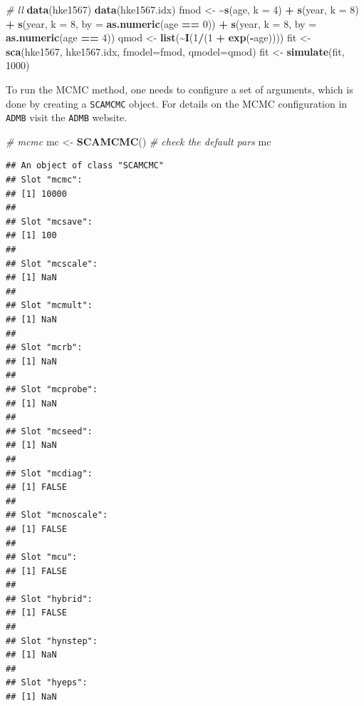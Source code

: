 \documentclass[
]{book}
\newenvironment{Shaded}{\begin{snugshade}}{\end{snugshade}}
\newcommand{\AttributeTok}[1]{\textcolor[rgb]{0.13,0.29,0.53}{#1}}
\newcommand{\CommentTok}[1]{\textcolor[rgb]{0.56,0.35,0.01}{\textit{#1}}}
\newcommand{\DecValTok}[1]{\textcolor[rgb]{0.00,0.00,0.81}{#1}}
\newcommand{\ErrorTok}[1]{\textcolor[rgb]{0.64,0.00,0.00}{\textbf{#1}}}
\newcommand{\FunctionTok}[1]{\textcolor[rgb]{0.13,0.29,0.53}{\textbf{#1}}}
\newcommand{\NormalTok}[1]{#1}
\newcommand{\OtherTok}[1]{\textcolor[rgb]{0.56,0.35,0.01}{#1}}
\newcommand{\SpecialCharTok}[1]{\textcolor[rgb]{0.81,0.36,0.00}{\textbf{#1}}}
\begin{document}
\begin{Shaded}
\begin{Highlighting}[]
\CommentTok{\# ll}
\FunctionTok{data}\NormalTok{(hke1567)}
\FunctionTok{data}\NormalTok{(hke1567.idx)}
\NormalTok{fmod }\OtherTok{\textless{}{-}} \ErrorTok{\textasciitilde{}}\FunctionTok{s}\NormalTok{(age, }\AttributeTok{k =} \DecValTok{4}\NormalTok{) }\SpecialCharTok{+} \FunctionTok{s}\NormalTok{(year, }\AttributeTok{k =} \DecValTok{8}\NormalTok{) }\SpecialCharTok{+} \FunctionTok{s}\NormalTok{(year, }\AttributeTok{k =} \DecValTok{8}\NormalTok{, }\AttributeTok{by =} \FunctionTok{as.numeric}\NormalTok{(age }\SpecialCharTok{==} \DecValTok{0}\NormalTok{)) }\SpecialCharTok{+} \FunctionTok{s}\NormalTok{(year, }\AttributeTok{k =} \DecValTok{8}\NormalTok{, }\AttributeTok{by =} \FunctionTok{as.numeric}\NormalTok{(age }\SpecialCharTok{==} \DecValTok{4}\NormalTok{))}
\NormalTok{qmod }\OtherTok{\textless{}{-}} \FunctionTok{list}\NormalTok{(}\SpecialCharTok{\textasciitilde{}}\FunctionTok{I}\NormalTok{(}\DecValTok{1}\SpecialCharTok{/}\NormalTok{(}\DecValTok{1} \SpecialCharTok{+} \FunctionTok{exp}\NormalTok{(}\SpecialCharTok{{-}}\NormalTok{age))))}
\NormalTok{fit }\OtherTok{\textless{}{-}} \FunctionTok{sca}\NormalTok{(hke1567, hke1567.idx, }\AttributeTok{fmodel=}\NormalTok{fmod, }\AttributeTok{qmodel=}\NormalTok{qmod)}
\NormalTok{fit }\OtherTok{\textless{}{-}} \FunctionTok{simulate}\NormalTok{(fit, }\DecValTok{1000}\NormalTok{)}
\end{Highlighting}
\end{Shaded}

To run the MCMC method, one needs to configure a set of arguments, which is done by creating a \texttt{SCAMCMC} object. For details on the MCMC configuration in \texttt{ADMB} visit the \texttt{ADMB} website.

\begin{Shaded}
\begin{Highlighting}[]
\CommentTok{\# mcmc}
\NormalTok{mc }\OtherTok{\textless{}{-}} \FunctionTok{SCAMCMC}\NormalTok{()}
\CommentTok{\# check the default pars}
\NormalTok{mc}
\end{Highlighting}
\end{Shaded}

\begin{verbatim}
## An object of class "SCAMCMC"
## Slot "mcmc":
## [1] 10000
## 
## Slot "mcsave":
## [1] 100
## 
## Slot "mcscale":
## [1] NaN
## 
## Slot "mcmult":
## [1] NaN
## 
## Slot "mcrb":
## [1] NaN
## 
## Slot "mcprobe":
## [1] NaN
## 
## Slot "mcseed":
## [1] NaN
## 
## Slot "mcdiag":
## [1] FALSE
## 
## Slot "mcnoscale":
## [1] FALSE
## 
## Slot "mcu":
## [1] FALSE
## 
## Slot "hybrid":
## [1] FALSE
## 
## Slot "hynstep":
## [1] NaN
## 
## Slot "hyeps":
## [1] NaN
\end{verbatim}
\end{document}
